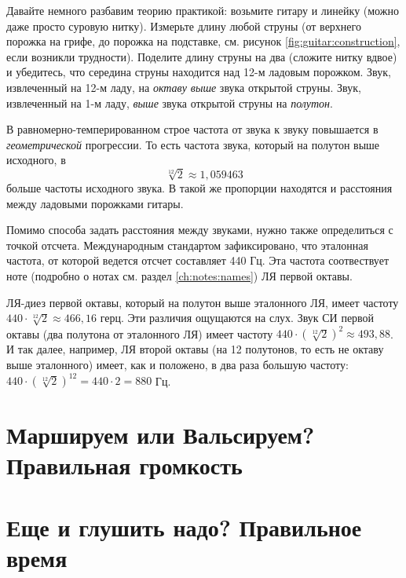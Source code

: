 \begin{Example}
    Давайте немного разбавим теорию практикой: возьмите гитару и линейку (можно даже просто суровую нитку). Измерьте длину любой струны (от верхнего порожка на грифе, до порожка на подставке, см. рисунок \ref{fig:guitar:construction}, если возникли трудности). Поделите длину струны на два (сложите нитку вдвое) и убедитесь, что середина струны находится над 12-м ладовым порожком. Звук, извлеченный на 12-м ладу, на \emph{октаву выше} звука открытой струны. Звук, извлеченный на 1-м ладу, \emph{выше} звука открытой струны на \emph{полутон}.
\end{Example}

В равномерно-темперированном строе частота от звука к звуку повышается в \emph{геометрической} прогрессии. То есть частота звука, который на полутон выше исходного, в \[\sqrt[12]{2}\approx 1,059463\] больше частоты исходного звука. В такой же пропорции находятся и расстояния между ладовыми порожками гитары.

Помимо способа задать расстояния между звуками, нужно также определиться с точкой отсчета. Международным стандартом зафиксировано, что эталонная частота, от которой ведется отсчет составляет 440 Гц. Эта частота соотвествует ноте (подробно о нотах см. раздел \ref{ch:notes:names}) ЛЯ первой октавы. 

ЛЯ-диез первой октавы, который на полутон выше эталонного ЛЯ, имеет частоту $440\cdot\sqrt[12]{2}\approx 466,16$ герц. Эти различия ощущаются на слух. Звук СИ первой октавы (два полутона от эталонного ЛЯ) имеет частоту $440\cdot(\sqrt[12]{2})^2\approx 493,88$. И так далее, например, ЛЯ второй октавы (на 12 полутонов, то есть не октаву выше эталонного) имеет, как и положено, в два раза большую частоту: $440\cdot(\sqrt[12]{2})^{12}=440\cdot 2=880$ Гц.


\section{Маршируем или Вальсируем? Правильная громкость}
\label{ch:music:volume}


\section{Еще и глушить надо? Правильное время}
\label{ch:music:rythm}




